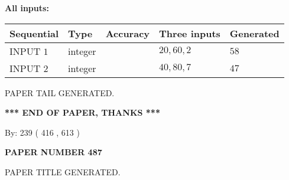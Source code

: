 \documentclass[12pt]{article}
\begin{document}
   
   
   
\noindent\vspace{0.1in}\hspace{-0.08in} {\textbf{\Large{All inputs: }}}
   
   
  
  
\noindent\begin{tabular}{|l|l|l|l|l|}
\hline
 Sequential & Type & Accuracy & Three inputs & Generated \\ 
\hline
 
 
  INPUT $  1 $ & integer &  & $
 20
 , 
 60
 , 
 2
 $ & $ 58 $ 
 \\  \hline  
 
 
  INPUT $  2 $ & integer &  & $
 40
 , 
 80
 , 
 7
 $ & $ 47 $ 
 \\  \hline  
 \end{tabular}
   
   
   
   
   
   
 \vspace{0.2in}
 
   
   
\vspace{2.0in} PAPER TAIL GENERATED.
   
   
   
   
\vspace{1.0in} 
{\textbf{\large{ *** END OF PAPER, THANKS *** }}} 
   
   
\hspace{1.0in} By: 
 239 ( 416 ,  613 )
   
   
   
   
\newpage 
\setcounter{page}{ 
   487001 } 
   
   
   
   
 {\textbf{ \Large{ PAPER NUMBER  487  }}}
   
   
\vspace{0.2in}
   
   
   
   
   
   
   
   
 \vspace{0.2in}
 
 
 
 
   
   
 PAPER TITLE GENERATED.
   
   
   
\vspace{0.2in}
   
\end{document}

